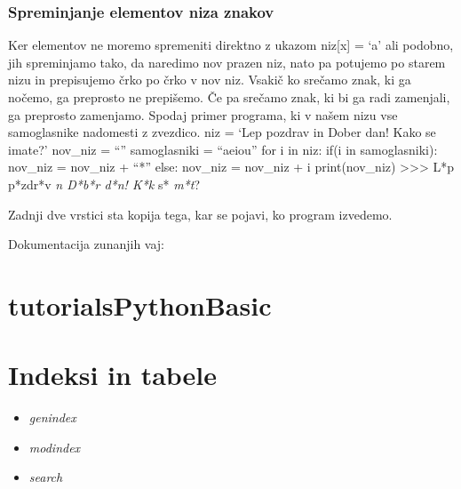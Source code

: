 \documentclass[letterpaper,10pt,english]{sphinxmanual}
\begin{document}
\subsection{Spreminjanje elementov niza znakov}
\label{skripta/podatkovni_tipi:spreminjanje-elementov-niza-znakov}
Ker elementov ne moremo spremeniti direktno z ukazom niz{[}x{]} = `a' ali podobno, jih spreminjamo tako, da naredimo nov prazen niz, nato pa potujemo po starem nizu in prepisujemo črko po črko v nov niz. Vsakič ko srečamo znak, ki ga nočemo, ga preprosto ne prepišemo. Če pa srečamo znak, ki bi ga radi zamenjali, ga preprosto zamenjamo. Spodaj primer programa, ki v našem nizu vse samoglasnike nadomesti z zvezdico.
niz = `Lep pozdrav in Dober dan! Kako se imate?' nov\_niz = ``'' samoglasniki = ``aeiou'' for i in niz: if(i in samoglasniki): nov\_niz = nov\_niz + ``*'' else: nov\_niz = nov\_niz + i print(nov\_niz) \textgreater{}\textgreater{}\textgreater{} L*p p*zdr*v \emph{n D*b*r d*n! K*k} s* \emph{m*t}?

Zadnji dve vrstici sta kopija tega, kar se pojavi, ko program izvedemo.

Dokumentacija zunanjih vaj:


\chapter{tutorialsPythonBasic}
\label{autodoc/modules:tutorialspythonbasic}\label{autodoc/modules::doc}

\chapter{Indeksi in tabele}
\label{index:indeksi-in-tabele}\begin{itemize}
\item {} 
\emph{genindex}

\item {} 
\emph{modindex}

\item {} 
\emph{search}

\end{itemize}



\renewcommand{\indexname}{Index}
\printindex
\end{document}
